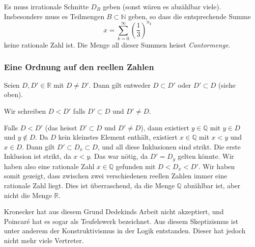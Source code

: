 \documentclass[../main.tex]{subfiles}
\begin{document}
Es muss irrationale Schnitte $D_{B}$ geben (sonst wären es abzählbar viele).
Insbesondere muss es Teilmengen $B \subset \mathbb N$ geben, so dass die
entsprechende Summe
\[x = \sum_{k=0}^{\infty} {\left(\frac{1}{3}\right)}^{n_{k}}\]
keine rationale Zahl ist.
Die Menge all dieser Summen heisst \textit{Cantormenge}.

\subsubsection*{Eine Ordnung auf den reellen Zahlen}
Seien $D, D' \in \mathbb R$ mit $D \neq D'$. Dann gilt entweder
$D \subset D'$ oder $D' \subset D$ (siehe oben).
\begin{definition}
  Wir schreiben $D < D'$ falls $D' \subset D$ und $D' \neq D$.
\end{definition}

\begin{remark}
  Falls $D < D'$ (das heisst $D' \subset D$ und $D' \neq D$), dann
  existiert $y \in \mathbb Q$ mit $y \in D$ und $y \notin D$.
  Da $D$ kein kleinstes Element enthält,
  existiert $x \in \mathbb Q$ mit $x < y$ und $x \in D$.
  Dann gilt $D' \subset D_{x} \subset D$, und all diese
  Inklusionen sind strikt. Die erste Inklusion ist strikt,
  da $x < y$. Das war nötig, da $D' = D_{y}$
  gelten könnte. Wir haben also eine rationale Zahl
  $x \in \mathbb Q$ gefunden mit
  $D < D_{x} < D'$.
  Wir haben somit gezeigt, dass zwischen zwei verschiedenen reellen
  Zahlen immer eine rationale Zahl liegt.
  Dies ist überraschend, da die Menge $\mathbb Q$
  abzählbar ist, aber nicht die Menge $\mathbb R$.

  Kronecker hat aus diesem Grund Dedekinds Arbeit nicht akzeptiert,
  und Poincaré hat es sogar als Teufelswerk bezeichnet.
  Aus diesem Skeptizismus ist unter anderem der
  Konstruktivismus in der Logik entstanden.
  Dieser hat jedoch nicht mehr viele Vertreter.
\end{remark}
\end{document}
